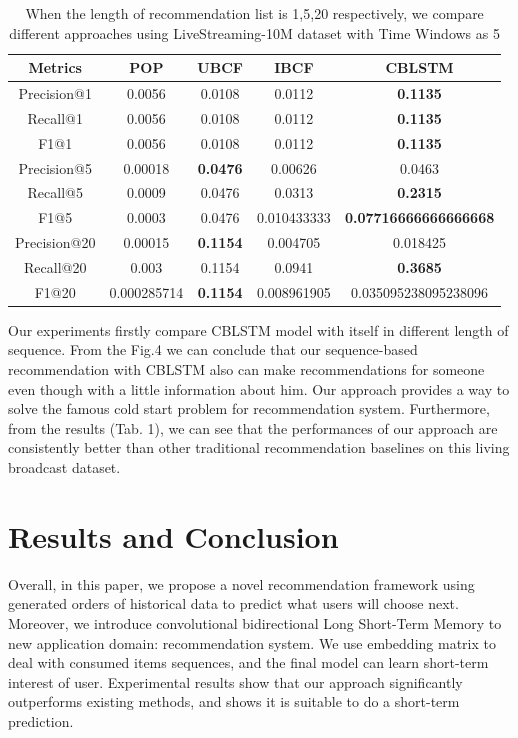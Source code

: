 \documentclass[runningheads]{llncs}
\begin{document}
\begin{table}[htbp]
\begin{center}
\begin{tabular}{|c|c|c|c|c|}
\hline

\textbf{Metrics} & \textbf{POP}& \textbf{UBCF}& \textbf{IBCF}& \textbf{CBLSTM} \\
\hline
Precision@1& 0.0056& 0.0108 & 0.0112 & \textbf{0.1135} \\
\hline
Recall@1& 0.0056& 0.0108 & 0.0112 & \textbf{0.1135}\\
\hline
F1@1& 0.0056& 0.0108 & 0.0112 & \textbf{0.1135}\\
\hline
Precision@5& 0.00018& \textbf{0.0476} & 0.00626 & 0.0463\\
\hline
Recall@5& 0.0009& 0.0476 & 0.0313 & \textbf{0.2315}\\
\hline
F1@5& 0.0003& 0.0476 & 0.010433333 & \textbf{0.07716666666666668}\\
\hline
Precision@20& 0.00015& \textbf{0.1154} & 0.004705 & 0.018425\\
\hline
Recall@20& 0.003& 0.1154 & 0.0941 & \textbf{0.3685}\\
\hline
F1@20& 0.000285714& \textbf{0.1154} & 0.008961905 & 0.035095238095238096\\
\hline
\end{tabular}
\label{tab1}
\end{center}
\caption{When the length of recommendation list is 1,5,20 respectively, we compare different approaches using LiveStreaming-10M dataset with Time Windows as 5}
\end{table}

Our experiments firstly compare CBLSTM model with itself in different length of sequence. From the Fig.4 we can conclude that our sequence-based recommendation with CBLSTM also can make recommendations for someone even though with a little information about him. Our approach provides a way to solve the famous cold start problem for recommendation system. Furthermore, from the results (Tab. 1), we can see that the performances of our approach are consistently better than other traditional recommendation baselines on this living broadcast dataset.

\section{Results and Conclusion}

Overall, in this paper, we propose a novel recommendation framework using generated orders of historical data to predict what users will choose next. Moreover, we introduce convolutional bidirectional Long Short-Term Memory to new application domain: recommendation system. We use embedding matrix to deal with consumed items sequences, and the final model can learn short-term interest of user. Experimental results show that our approach significantly outperforms existing methods, and shows it is suitable to do a short-term prediction. 
\end{document}

